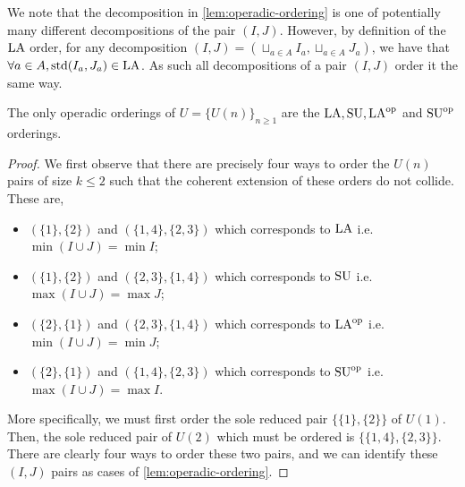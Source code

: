 We note that the decomposition in \cref{lem:operadic-ordering} is one of potentially many different decompositions of the pair $(I,J)$. 
However, by definition of the $\mathrm{LA}$ order, for any decomposition $(I,J) = (\sqcup_{a\in A} I_a, \sqcup_{a \in A} J_a)$, we have that $\forall a \in A, \operatorname{std}(I_a, J_a) \in \mathrm{LA}$.
As such all decompositions of a pair $(I,J)$ order it the same way.

\begin{proposition}
    \label{prop:operadic-ordering}
The only operadic orderings of $U=\{U(n)\}_{n\geq 1}$ are the $\mathrm{LA},\mathrm{SU},\mathrm{LA}^{\mathrm{op}}$ and $\mathrm{SU}^{\mathrm{op}}$ orderings.
\end{proposition}

\begin{proof}
We first observe that there are precisely four ways to order the $U(n)$ pairs of size $k\leq 2$ such that the coherent extension of these orders do not collide.
These are,
\begin{itemize} 
    \item $(\{1\},\{2\})$ and $(\{1,4\},\{2,3\})$ which corresponds to $\mathrm{LA}$ i.e. $\min(I\cup J) = \min I$;
    \item $(\{1\},\{2\})$ and $(\{2,3\},\{1,4\})$ which corresponds to $\mathrm{SU}$ i.e. $\max(I\cup J) = \max J$;
    \item $(\{2\},\{1\})$ and $(\{2,3\},\{1,4\})$ which corresponds to $\mathrm{LA}^{\mathrm{op}}$ i.e. $\min(I\cup J) = \min J$;
    \item $(\{2\},\{1\})$ and $(\{1,4\},\{2,3\})$ which corresponds to $\mathrm{SU}^{\mathrm{op}}$ i.e. $\max(I\cup J) = \max I$.
\end{itemize}
More specifically, we must first order the sole reduced pair $\{\{1\},\{2\}\}$ of $U(1)$.
Then, the sole reduced pair of $U(2)$ which must be ordered is $\{\{1,4\},\{2,3\} \}$.
There are clearly four ways to order these two pairs, and we can identify these $(I,J)$ pairs as cases of \cref{lem:operadic-ordering}.


\end{proof}
